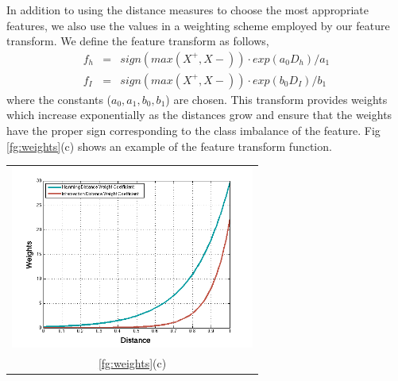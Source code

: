 In addition to using the distance measures to choose the most appropriate features, we also use the values in a weighting scheme employed by our feature transform. We define the feature transform as follows,
\begin{eqnarray}
f_{h} &=& sign(max(X^{+}, X{-})) \cdot exp(a_0 D_h)/a_1 \\
f_{I} &=& sign(max(X^{+}, X{-})) \cdot exp(b_0 D_{I})/b_1
\end{eqnarray}
where the constants ($a_0,a_1,b_0,b_1$) are chosen. This transform provides weights which increase exponentially as the distances grow and ensure that the weights have the proper sign corresponding to the class imbalance of the feature. Fig \ref{fg:weights}(c) shows an example of the feature transform function.
\begin{center}
\begin{tabular}{@{}c@{}}
\label{fg:weights}
\includegraphics[height=60mm]{figs/features/weightScheme} \\
\ref{fg:weights}(c)\\
\end{tabular}
\end{center}

